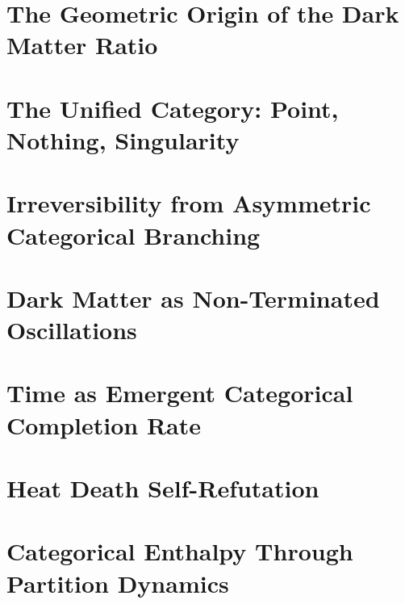 \section{The Geometric Origin of the Dark Matter Ratio}
\label{sec:ratio}


\section{The Unified Category: Point, Nothing, Singularity}
\label{sec:unified}


\section{Irreversibility from Asymmetric Categorical Branching}
\label{sec:asymmetric}


\section{Dark Matter as Non-Terminated Oscillations}
\label{sec:dark_termination}


\section{Time as Emergent Categorical Completion Rate}
\label{sec:emergent_time}


\section{Heat Death Self-Refutation}
\label{sec:heat_refutation}


\section{Categorical Enthalpy Through Partition Dynamics}
\label{sec:enthalpy}


